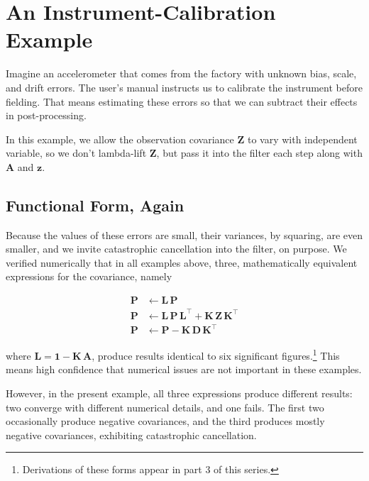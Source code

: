 \documentclass[10pt,oneside,x11names]{article}
\begin{document}
\section{An Instrument-Calibration Example}
\label{sec:orgheadline26}

Imagine an accelerometer that comes from the factory with unknown bias, scale,
and drift errors. The user's manual instructs us to calibrate the instrument
before fielding. That means estimating these errors so that we can subtract
their effects in post-processing. 

In this example, we allow the observation covariance \(\mathbold{Z}\) to vary with
independent variable, so we don't lambda-lift \(\mathbold{Z}\), but pass it into
the filter each step along with \(\mathbold{A}\) and \(\mathbold{z}\).

\subsection{Functional Form, Again}
\label{sec:orgheadline22}

Because the values of these errors are small, their variances, by squaring, are
even smaller, and we invite catastrophic cancellation into the filter, on
purpose. We verified numerically that in all examples above, three,
mathematically equivalent expressions for the covariance, namely

\begin{align*}
\mathbold{P} &\leftarrow
\mathbold{L}\,
\mathbold{P} 
\\
\mathbold{P} &\leftarrow
\mathbold{L}\,
\mathbold{P}\,
\mathbold{L}^\intercal +
\mathbold{K}\,
\mathbold{Z}\,
\mathbold{K}^\intercal
\\
\mathbold{P} &\leftarrow
\mathbold{P} -
\mathbold{K}\,
\mathbold{D}\,
\mathbold{K}^\intercal
\end{align*}

\noindent where \(\mathbold{L}=\mathbold{1}-\mathbold{K}\,\mathbold{A}\),
produce results identical to six significant 
figures.\footnote{Derivations of these forms appear in part 3 of this series.} 
This means high
confidence that numerical issues are not important in these examples.

However, in the present example, all three expressions produce different
results: two converge with different numerical details, and one fails. The first
two occasionally produce negative covariances, and the third produces mostly
negative covariances, exhibiting catastrophic cancellation.
\end{document}
